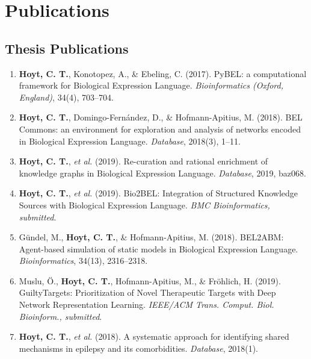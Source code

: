 % 

\setlength{\parskip}{1em} %
\renewcommand{\baselinestretch}{1.2} %

% 

\chapter*{Publications}

\section*{Thesis Publications}

\begin{enumerate}
    \item \textbf{Hoyt, C. T.}, Konotopez, A., \& Ebeling, C. (2017). PyBEL: a computational framework for Biological Expression Language. \textit{Bioinformatics (Oxford, England)}, 34(4), 703–704.
    \item \textbf{Hoyt, C. T.}, Domingo-Fern\'{a}ndez, D., \& Hofmann-Apitius, M. (2018). BEL Commons: an environment for exploration and analysis of networks encoded in Biological Expression Language. \textit{Database}, 2018(3), 1–11.
    \item \textbf{Hoyt, C. T.}, \textit{et al.} (2019). Re-curation and rational enrichment of knowledge graphs in Biological Expression Language. \textit{Database}, 2019, baz068.
    \item \textbf{Hoyt, C. T.}, \textit{et al.} (2019). Bio2BEL: Integration of Structured Knowledge Sources with Biological Expression Language. \textit{BMC Bioinformatics, submitted}.
    \item Gündel, M., \textbf{Hoyt, C. T.}, \& Hofmann-Apitius, M. (2018). BEL2ABM: Agent-based simulation of static models in Biological Expression Language. \textit{Bioinformatics}, 34(13), 2316–2318.
    \item Muslu, Ö., \textbf{Hoyt, C. T.}, Hofmann-Apitius, M., \& Fröhlich, H. (2019). GuiltyTargets: Prioritization of Novel Therapeutic Targets with Deep Network Representation Learning. \textit{IEEE/ACM Trans. Comput. Biol. Bioinform., submitted}.
    \item \textbf{Hoyt, C. T.}, \textit{et al.} (2018). A systematic approach for identifying shared mechanisms in epilepsy and its comorbidities. \textit{Database}, 2018(1).
\end{enumerate}


